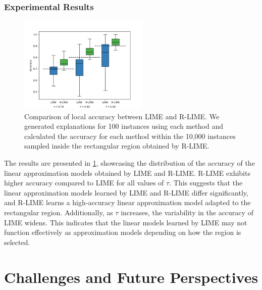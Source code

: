 \documentclass[runningheads]{llncs}
\begin{document}
\subsubsection{Experimental Results}
\begin{figure}[tbp]
  \centering
  \includegraphics[width=0.55\textwidth]{python/exp2/box_plot}
  \caption[Comparison of Local Accuracy between R-LIME and LIME]{%
    Comparison of local accuracy between LIME and R-LIME.
    We generated explanations for 100 instances using each method
    and calculated the accuracy for each method within the 10,000 instances
    sampled inside the rectangular region obtained by R-LIME.
  }\label{fig:box_plot}
\end{figure}
The results are presented in \cref{fig:box_plot}, showcasing the distribution of the accuracy of the linear approximation models obtained by LIME and R-LIME.
R-LIME exhibits higher accuracy compared to LIME for all values of $\tau$. This suggests that the linear approximation models learned by LIME and R-LIME differ significantly, and R-LIME learns a high-accuracy linear approximation model adapted to the rectangular region. Additionally, as $\tau$ increases, the variability in the accuracy of LIME widens. This indicates that the linear models learned by LIME may not function effectively as approximation models depending on how the region is selected.

\section{Challenges and Future Perspectives}
 
\end{document}
